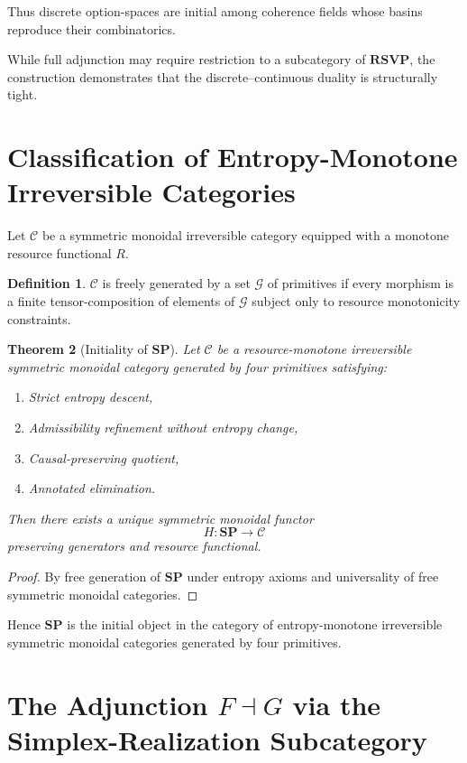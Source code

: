 \documentclass[12pt,a4paper]{article}
\newtheorem{theorem}{Theorem}[section]
\theoremstyle{definition}
\newtheorem{definition}[theorem]{Definition}
\theoremstyle{remark}
\newcommand{\SP}{\mathbf{SP}}
\newcommand{\RSVP}{\mathbf{RSVP}}
\begin{document}
Thus discrete option-spaces are initial among coherence fields whose
basins reproduce their combinatorics.

While full adjunction may require restriction to a subcategory of
$\RSVP$, the construction demonstrates that the discrete--continuous
duality is structurally tight.

\section{Classification of Entropy-Monotone Irreversible Categories}
\label{sec:classification}

Let $\mathcal{C}$ be a symmetric monoidal irreversible category
equipped with a monotone resource functional $R$.

\begin{definition}
$\mathcal{C}$ is freely generated by a set $\mathcal{G}$ of primitives
if every morphism is a finite tensor-composition of elements of $\mathcal{G}$
subject only to resource monotonicity constraints.
\end{definition}

\begin{theorem}[Initiality of $\SP$]
Let $\mathcal{C}$ be a resource-monotone irreversible symmetric monoidal
category generated by four primitives satisfying:
\begin{enumerate}
  \item Strict entropy descent,
  \item Admissibility refinement without entropy change,
  \item Causal-preserving quotient,
  \item Annotated elimination.
\end{enumerate}
Then there exists a unique symmetric monoidal functor
\[
  H : \SP \to \mathcal{C}
\]
preserving generators and resource functional.
\end{theorem}

\begin{proof}
By free generation of $\SP$ under entropy axioms and universality of free symmetric monoidal categories.
\end{proof}

Hence $\SP$ is the initial object in the category of entropy-monotone
irreversible symmetric monoidal categories generated by four primitives.



\section{The Adjunction \texorpdfstring{$F\dashv G$}{F ⊣ G} via the Simplex-Realization Subcategory}
\label{sec:adjunction-precise}
\end{document}
